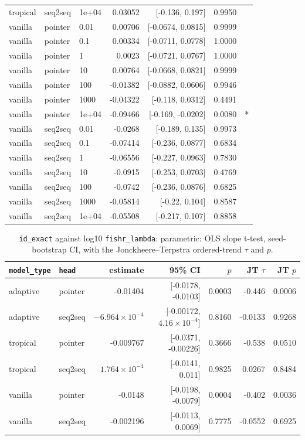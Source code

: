 \documentclass[10pt]{article}
\begin{document}
{\begin{longtable}{lllrrrl}
tropical & seq2seq & 1e+04 & 0.03052 & [-0.136, 0.197] & 0.9950 & \\
vanilla & pointer & 0.01 & 0.00706 & [-0.0674, 0.0815] & 0.9999 & \\
vanilla & pointer & 0.1 & 0.00334 & [-0.0711, 0.0778] & 1.0000 & \\
vanilla & pointer & 1 & 0.0023 & [-0.0721, 0.0767] & 1.0000 & \\
vanilla & pointer & 10 & 0.00764 & [-0.0668, 0.0821] & 0.9999 & \\
vanilla & pointer & 100 & -0.01382 & [-0.0882, 0.0606] & 0.9946 & \\
vanilla & pointer & 1000 & -0.04322 & [-0.118, 0.0312] & 0.4491 & \\
vanilla & pointer & 1e+04 & -0.09466 & [-0.169, -0.0202] & 0.0080 & *\\
vanilla & seq2seq & 0.01 & -0.0268 & [-0.189, 0.135] & 0.9973 & \\
vanilla & seq2seq & 0.1 & -0.07414 & [-0.236, 0.0877] & 0.6834 & \\
vanilla & seq2seq & 1 & -0.06556 & [-0.227, 0.0963] & 0.7830 & \\
vanilla & seq2seq & 10 & -0.0915 & [-0.253, 0.0703] & 0.4769 & \\
vanilla & seq2seq & 100 & -0.0742 & [-0.236, 0.0876] & 0.6825 & \\
vanilla & seq2seq & 1000 & -0.05814 & [-0.22, 0.104] & 0.8587 & \\
vanilla & seq2seq & 1e+04 & -0.05508 & [-0.217, 0.107] & 0.8858 & \\
\bottomrule
\end{longtable}
}

{\small
\begin{longtable}{llrrrrr}
\caption{\texttt{id\_exact} against log10 \texttt{fishr\_lambda}: parametric: OLS slope t-test, seed-bootstrap CI, with the Jonckheere--Terpstra ordered-trend $\tau$ and $p$.}\label{tab:trend-id_exact}\\
\toprule
\texttt{model\_type} & \texttt{head} & estimate & 95\% CI & $p$ & JT $\tau$ & JT $p$\\
\midrule
\endhead
adaptive & pointer & -0.01404 & [-0.0178, -0.0103] & 0.0003 & -0.446 & 0.0006\\
adaptive & seq2seq & $-6.964\times10^{-4}$ & [-0.00172, $4.16\times10^{-4}$] & 0.8160 & -0.0133 & 0.9268\\
tropical & pointer & -0.009767 & [-0.0371, -0.00226] & 0.3666 & -0.538 & 0.0510\\
tropical & seq2seq & $1.764\times10^{-4}$ & [-0.0141, 0.011] & 0.9825 & 0.0267 & 0.8484\\
vanilla & pointer & -0.0148 & [-0.0198, -0.0079] & 0.0004 & -0.402 & 0.0036\\
vanilla & seq2seq & -0.002196 & [-0.0113, 0.0069] & 0.7775 & -0.0552 & 0.6925\\
\bottomrule
\end{longtable}
}
\end{document}
